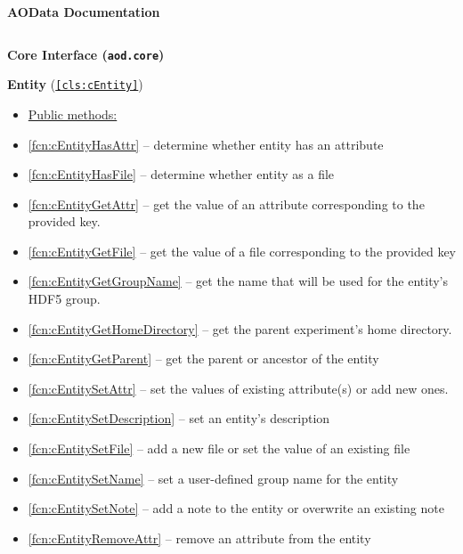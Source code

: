 \documentclass{aodatadocs}
\begin{document}
\begin{center}
    \textsf{\textbf{\Huge AOData Documentation}}
\end{center}
$\quad$\\

{\sffamily\begin{legal}[font=\Large\bfseries, itemsep=1.5ex]%
    \item {\Large\bfseries Core Interface (\texttt{aod.core})}
    \begin{legal}[font=\large\bfseries, itemsep=1ex]
        \item {\large\textbf{Entity} (\texttt{\ref{cls:cEntity}})}
        \begin{itemize}
            \item[] \hspace{-2.2ex}\underline{\textcolor{cyan2}{Public methods:}}
            \item \ref{fcn:cEntityHasAttr} -- determine whether entity has an attribute 
            \item \ref{fcn:cEntityHasFile} -- determine whether entity as a file
            \item \ref{fcn:cEntityGetAttr} -- get the value of an attribute corresponding to the provided key.
            \item \ref{fcn:cEntityGetFile} -- get the value of a file corresponding to the provided key
            \item \ref{fcn:cEntityGetGroupName} -- get the name that will be used for the entity's HDF5 group.
            \item \ref{fcn:cEntityGetHomeDirectory} -- get the parent experiment's home directory.
            \item \ref{fcn:cEntityGetParent} -- get the parent or ancestor of the entity
            \item \ref{fcn:cEntitySetAttr} -- set the values of existing attribute(s) or add new ones.
            \item \ref{fcn:cEntitySetDescription} -- set an entity's description 
            \item \ref{fcn:cEntitySetFile} -- add a new file or set the value of an existing file
            \item \ref{fcn:cEntitySetName} -- set a user-defined group name for the entity
            \item \ref{fcn:cEntitySetNote} -- add a note to the entity or overwrite an existing note
            \item \ref{fcn:cEntityRemoveAttr} -- remove an attribute from the entity

\end{itemize}
\end{legal}
\end{legal}}
\end{document}
